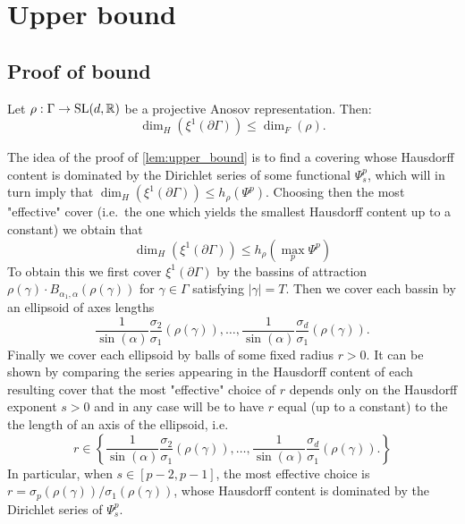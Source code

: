 \documentclass{report}
\begin{document}
\chapter{Upper bound}\label{ch:upper_bound}
\section{Proof of bound}
\begin{lemma}\label{lem:upper_bound}
Let $\rho: \Gamma \to \operatorname{{\mathrm{SL}}}(d, \mathbb R)$ be a projective Anosov representation. 
Then:
\[
    \dim_H(\xi^1 (\partial \Gamma) ) \leq \dim_F(\rho).
\]
\end{lemma}
\begin{remark}
    The idea of the proof of \cref{lem:upper_bound} is to find a covering whose Hausdorff content is dominated by the Dirichlet series of some functional $\Psi_s^p$, which will in turn imply that $\dim_H(\xi^1(\partial \Gamma)) \leq h_\rho(\Psi^p) $.
    Choosing then the most "effective" cover (i.e.\ the one which yields the smallest Hausdorff content up to a constant) we obtain that
    \[
        \dim_H(\xi^1(\partial \Gamma)) \leq h_\rho(\max_p \Psi^p)
    \]
    To obtain this we first cover $\xi^1(\partial \Gamma)$ by the bassins of attraction $\rho(\gamma) \cdot B_{\alpha_1, \alpha} (\rho(\gamma))$ for $\gamma \in \Gamma$ satisfying $|\gamma| = T$.
    Then we cover each bassin by an ellipsoid of axes lengths
    \[
        \frac{1}{\sin(\alpha)} \frac{\sigma_2}{\sigma_1}(\rho(\gamma)), \ldots, 
        \frac{1}{\sin(\alpha)} \frac{\sigma_d}{\sigma_1}(\rho(\gamma)).
    \]
    Finally we cover each ellipsoid by balls of some fixed radius $r>0$.
    It can be shown by comparing the series appearing in the Hausdorff content of each resulting cover that the most "effective" choice of $r$ depends only on the Hausdorff exponent $s > 0$ and in any case will be to have $r$ equal (up to a constant) to the the length of an axis of the ellipsoid, i.e.\
    \[
        r \in \left\{
            \frac{1}{\sin(\alpha)} \frac{\sigma_2}{\sigma_1}(\rho(\gamma)), \ldots, 
            \frac{1}{\sin(\alpha)} \frac{\sigma_d}{\sigma_1}(\rho(\gamma)).    
        \right\}
    \]
    In particular, when $s \in [p-2, p-1]$, the most effective choice is $r = \sigma_p(\rho(\gamma))/\sigma_1(\rho(\gamma))$, whose Hausdorff content is dominated by the Dirichlet series of $\Psi_s^p$.
\end{remark}
\end{document}
